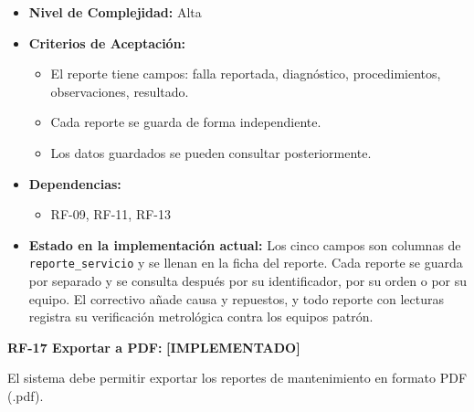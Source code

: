 \documentclass[12pt,a4paper]{article}
\newcommand{\estadoImplementado}{\textcolor{mainRed}{\textbf{[IMPLEMENTADO]}}}
\begin{document}
\begin{itemize}
  \item \textbf{Nivel de Complejidad:} Alta

  \item \textbf{Criterios de Aceptación:}
  \begin{itemize}
    \item El reporte tiene campos: falla reportada, diagnóstico, procedimientos, observaciones, resultado.
    \item Cada reporte se guarda de forma independiente.
    \item Los datos guardados se pueden consultar posteriormente.
  \end{itemize}

  \item \textbf{Dependencias:}
  \begin{itemize}
    \item RF-09, RF-11, RF-13
  \end{itemize}

  \item \textbf{Estado en la implementación actual:} Los cinco campos son columnas de \texttt{reporte\_servicio} y se llenan en la ficha del reporte. Cada reporte se guarda por separado y se consulta después por su identificador, por su orden o por su equipo. El correctivo añade causa y repuestos, y todo reporte con lecturas registra su verificación metrológica contra los equipos patrón.
\end{itemize}

\textbf{RF-17 Exportar a PDF:} \estadoImplementado{}

El sistema debe permitir exportar los reportes de mantenimiento en formato PDF (.pdf).
\end{document}
